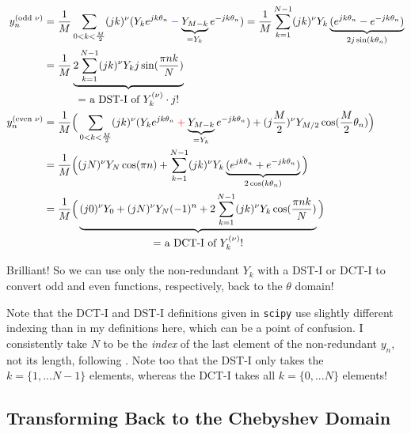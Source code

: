 \documentclass[10pt]{article}
\begin{document}
\begin{align}
y_n^{(\text{odd } \nu)} &= \frac{1}{M} \sum_{0 < k < \frac{M}{2}} (jk)^\nu (Y_k e^{jk\theta_n} \color{blue}-\color{black} \underbrace{Y_{M-k}}_{= Y_k} e^{-jk\theta_n}) = \frac{1}{M} \sum_{k=1}^{N-1} (jk)^\nu Y_k \underbrace{(e^{jk\theta_n} - e^{-jk\theta_n})}_{2j\sin(k\theta_n)} \notag \\
&= \frac{1}{M} \underbrace{2 \sum_{k=1}^{N-1} (jk)^\nu Y_k j \sin(\frac{\pi nk}{N})}_{\text{\normalsize = a DST-I of $Y_k^{(\nu)} \cdot j$!}} \label{y_prime_odd}\\
y_n^{(\text{even } \nu)} &= \frac{1}{M} \Big( \sum_{0 < k < \frac{M}{2}} (jk)^\nu (Y_k e^{jk\theta_n} \color{red}+\color{black} \underbrace{Y_{M-k}}_{= Y_k} e^{-jk\theta_n}) + (j\frac{M}{2})^\nu Y_{M/2} \cos(\frac{M}{2}\theta_n) \Big) \notag \\
&= \frac{1}{M} \Big( (jN)^\nu Y_N \cos(\pi n) + \sum_{k=1}^{N-1} (jk)^\nu Y_k \underbrace{(e^{jk\theta_n} + e^{-jk\theta_n})}_{2\cos(k\theta_n)} \Big) \notag \\
&= \frac{1}{M} \Big( \underbrace{(j0)^\nu Y_0 + (jN)^\nu Y_N (-1)^n + 2 \sum_{k=1}^{N-1} (jk)^\nu Y_k \cos(\frac{\pi nk}{N})}_{\text{\normalsize = a DCT-I of $Y_k^{(\nu)}$!}} \Big) \label{y_prime_even}
\end{align}

Brilliant! So we can use only the non-redundant $Y_k$ with a DST-I or DCT-I to convert odd and even functions, respectively, back to the $\theta$ domain!

Note that the DCT-I and DST-I definitions given in \texttt{scipy}\cite{dct}\cite{dst} use slightly different indexing than in my definitions here, which can be a point of confusion. I consistently take $N$ to be the \textit{index} of the last element of the non-redundant $y_n$, not its length, following \cite{trefethen8}. Note too that the DST-I only takes the $k = \{1, ... N-1\}$ elements, whereas the DCT-I takes all $k = \{0, ... N\}$ elements!

\subsection{Transforming Back to the Chebyshev Domain}
\end{document}
